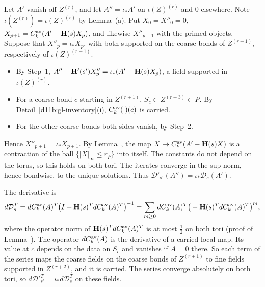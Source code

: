 \begin{step}
Let $A'$ vanish off $Z^{(r)}$, and let $A''=\iota_*A'$ on $\iota(Z)^{(r)}$ and $0$ elsewhere. Note $\iota(Z^{(r)})=\iota(Z)^{(r)}$ by Lemma~(a). Put $X_0=X''_0=0$, $X_{p+1}=C^{\rm av}_k(A'-\mathbf H(s)X_p)$, and likewise $X''_{p+1}$ with the primed objects. Suppose that $X''_p=\iota_*X_p$, with both supported on the coarse bonds of $Z^{(r+1)}$, respectively of $\iota(Z)^{(r+1)}$.
\begin{itemize}
\item By Step~1, $A''-\mathbf H'(s')X''_p=\iota_*(A'-\mathbf H(s)X_p)$, a field supported in $\iota(Z)^{(r)}$.
\item For a coarse bond $c$ starting in $Z^{(r+1)}$, $S_c\subset Z^{(r+3)}\subset P$. By Detail~\ref{d11b:gl-inventory}(i), $C^{\rm av}_k(\cdot)(c)$ is carried.
\item For the other coarse bonds both sides vanish, by Step~2.
\end{itemize}
Hence $X''_{p+1}=\iota_*X_{p+1}$. By Lemma~, the map $X\mapsto C^{\rm av}_k(A'-\mathbf H(s)X)$ is a contraction of the ball $\{|X|_\infty\le r_P\}$ into itself. The constants do not depend on the torus, so this holds on both tori. The iterates converge in the sup norm, hence bondwise, to the unique solutions. Thus $\mathcal D'_{s'}(A'')=\iota_*\mathcal D_s(A')$.

The derivative is
\[
d\mathcal D_s^T=dC^{\rm av}_k(A)^T\big(I+\mathbf H(s)^TdC^{\rm av}_k(A)^T\big)^{-1}=\sum_{m\ge0}dC^{\rm av}_k(A)^T\big(-\mathbf H(s)^TdC^{\rm av}_k(A)^T\big)^m ,
\]
where the operator norm of $\mathbf H(s)^TdC^{\rm av}_k(A)^T$ is at most $\frac12$ on both tori (proof of Lemma~). The operator $dC^{\rm av}_k(A)$ is the derivative of a carried local map. Its value at $c$ depends on the data on $S_c$ and vanishes if $A=0$ there. So each term of the series maps the coarse fields on the coarse bonds of $Z^{(r+1)}$ to fine fields supported in $Z^{(r+2)}$, and it is carried. The series converge absolutely on both tori, so $d\mathcal D'^T_{s'}=\iota_*d\mathcal D_s^T$ on these fields.
\end{step}

